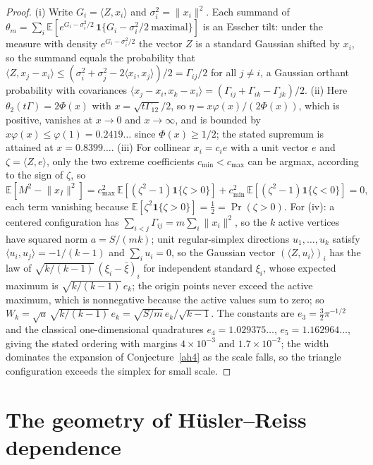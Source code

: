\documentclass[11pt]{article}
\theoremstyle{definition}
\newcommand{\E}{\mathbb E}
\providecommand{\E}{\mathbb E}
\begin{document}
\begin{proof}
(i) Write $G_i=\langle Z,x_i\rangle$ and $\sigma_i^2=\lVert x_i\rVert^2$.  Each summand of $\theta_m=\sum_i\E[e^{G_i-\sigma_i^2/2}\,\mathbf 1\{G_i-\sigma_i^2/2\ \text{maximal}\}]$ is an Esscher tilt: under the measure with density $e^{G_i-\sigma_i^2/2}$ the vector $Z$ is a standard Gaussian shifted by $x_i$, so the summand equals the probability that $\langle Z,x_j-x_i\rangle\le(\sigma_i^2+\sigma_j^2-2\langle x_i,x_j\rangle)/2=\Gamma_{ij}/2$ for all $j\ne i$, a Gaussian orthant probability with covariances $\langle x_j-x_i,x_k-x_i\rangle=(\Gamma_{ij}+\Gamma_{ik}-\Gamma_{jk})/2$.  (ii) Here $\theta_2(t\Gamma)=2\Phi(x)$ with $x=\sqrt{t\Gamma_{12}}/2$, so $\eta=x\varphi(x)/(2\Phi(x))$, which is positive, vanishes at $x\to0$ and $x\to\infty$, and is bounded by $x\varphi(x)\le\varphi(1)=0.2419\ldots$ since $\Phi(x)\ge1/2$; the stated supremum is attained at $x=0.8399\ldots$.  (iii) For collinear $x_i=c_ie$ with a unit vector $e$ and $\zeta=\langle Z,e\rangle$, only the two extreme coefficients $c_{\min}<c_{\max}$ can be argmax, according to the sign of $\zeta$, so
\[
\E[M^2-\lVert x_I\rVert^2]=c_{\max}^2\,\E[(\zeta^2-1)\mathbf 1\{\zeta>0\}]+c_{\min}^2\,\E[(\zeta^2-1)\mathbf 1\{\zeta<0\}]=0,
\]
each term vanishing because $\E[\zeta^2\mathbf 1\{\zeta>0\}]=\tfrac12=\Pr(\zeta>0)$.  For (iv): a centered configuration has $\sum_{i<j}\Gamma_{ij}=m\sum_i\lVert x_i\rVert^2$, so the $k$ active vertices have squared norm $a=S/(mk)$; unit regular-simplex directions $u_1,\ldots,u_k$ satisfy $\langle u_i,u_j\rangle=-1/(k-1)$ and $\sum_iu_i=0$, so the Gaussian vector $(\langle Z,u_i\rangle)_i$ has the law of $\sqrt{k/(k-1)}\,(\xi_i-\bar\xi)_i$ for independent standard $\xi_i$, whose expected maximum is $\sqrt{k/(k-1)}\,e_k$; the origin points never exceed the active maximum, which is nonnegative because the active values sum to zero; so $W_k=\sqrt a\,\sqrt{k/(k-1)}\,e_k=\sqrt{S/m}\,e_k/\sqrt{k-1}$.  The constants are $e_3=\tfrac32\pi^{-1/2}$ and the classical one-dimensional quadratures $e_4=1.029375\ldots$, $e_5=1.162964\ldots$, giving the stated ordering with margins $4\times10^{-3}$ and $1.7\times10^{-2}$; the width dominates the expansion of Conjecture~\ref{ah4} as the scale falls, so the triangle configuration exceeds the simplex for small scale.
\end{proof}

\section{The geometry of H\"usler--Reiss dependence}
\end{document}
